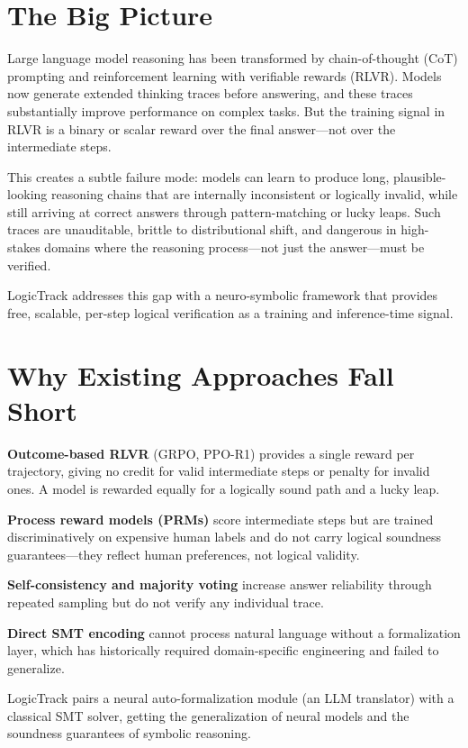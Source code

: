 \documentclass[10pt,twocolumn]{article}
\begin{document}
\section{The Big Picture}

Large language model reasoning has been transformed by chain-of-thought
(CoT) prompting and reinforcement learning with verifiable rewards (RLVR).
Models now generate extended thinking traces before answering, and these
traces substantially improve performance on complex tasks. But the training
signal in RLVR is a binary or scalar reward over the final answer---not
over the intermediate steps.

This creates a subtle failure mode: models can learn to produce long,
plausible-looking reasoning chains that are internally inconsistent or
logically invalid, while still arriving at correct answers through
pattern-matching or lucky leaps. Such traces are unauditable, brittle to
distributional shift, and dangerous in high-stakes domains where the
reasoning process---not just the answer---must be verified.

LogicTrack addresses this gap with a neuro-symbolic framework that
provides free, scalable, per-step logical verification as a training and
inference-time signal.

\section{Why Existing Approaches Fall Short}

\textbf{Outcome-based RLVR} (GRPO, PPO-R1) provides a single reward per
trajectory, giving no credit for valid intermediate steps or penalty for
invalid ones. A model is rewarded equally for a logically sound path and
a lucky leap.

\textbf{Process reward models (PRMs)} score intermediate steps but are
trained discriminatively on expensive human labels and do not carry
logical soundness guarantees---they reflect human preferences, not logical
validity.

\textbf{Self-consistency and majority voting} increase answer reliability
through repeated sampling but do not verify any individual trace.

\textbf{Direct SMT encoding} cannot process natural language without a
formalization layer, which has historically required domain-specific
engineering and failed to generalize.

LogicTrack pairs a neural auto-formalization module (an LLM translator)
with a classical SMT solver, getting the generalization of neural models
and the soundness guarantees of symbolic reasoning.
\end{document}
